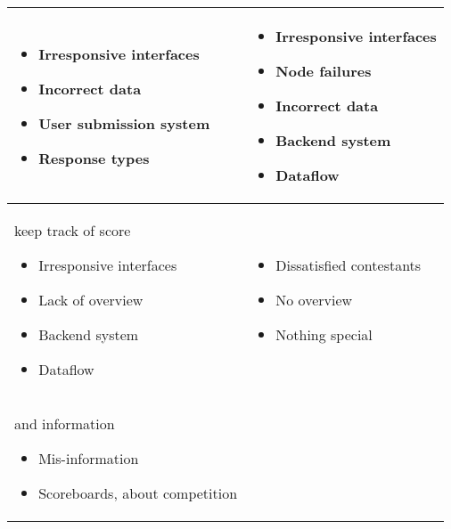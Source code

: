 \begin{tabular}{|m{2.9837599in}|m{3.1087599in}|}
\hline
\begin{itemize}
    \item Irresponsive interfaces
    \item Incorrect data
\end{itemize}
\begin{itemize}
    \item User submission system
    \item Response types
\end{itemize}
 &
\begin{itemize}
    \item Irresponsive interfaces
    \item Node failures
    \item Incorrect data
\end{itemize}

\begin{itemize}
\item Backend system\item 
Dataflow
\end{itemize}
\\\hline
keep track of score
\begin{itemize}
\item Irresponsive interfaces
\item
Lack of overview
\end{itemize}
\begin{itemize}
\item Backend system
\item 
Dataflow
\end{itemize}
 &
\begin{itemize}
\item Dissatisfied contestants\item
No overview\end{itemize}
\begin{itemize}
\item Nothing special\end{itemize}
\\\hline
and information
\begin{itemize}
\item Mis-information
\end{itemize}
\begin{itemize}
\item Scoreboards, about competition
\end{itemize}
 &
\\
\hline
\end{tabular}


